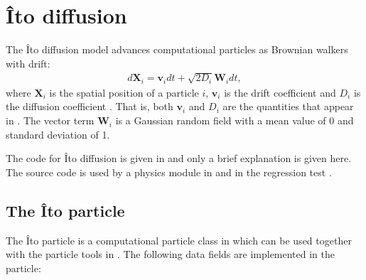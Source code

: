 \documentclass[letterpaper,10pt,english]{sphinxmanual}
\begin{document}
\section{Îto diffusion}
\label{\detokenize{Solvers/Ito:ito-diffusion}}\label{\detokenize{Solvers/Ito:chap-itodiffusion}}\label{\detokenize{Solvers/Ito::doc}}
\sphinxAtStartPar
The Îto diffusion model advances computational particles as Brownian walkers with drift:
\begin{equation*}
\begin{split}d\mathbf{X}_i = \mathbf{v}_idt + \sqrt{2D_i}\mathbf{W}_i dt,\end{split}
\end{equation*}
\sphinxAtStartPar
where \(\mathbf{X}_i\) is the spatial position of a particle \(i\), \(\mathbf{v}_i\) is the drift coefficient and \(D_i\) is the diffusion coefficient .
That is, both \(\mathbf{v}_i\) and \(D_i\) are the quantities that appear in {\hyperref[\detokenize{Solvers/CDR:chap-cdr}]{}}.
The vector term \(\mathbf{W}_i\) is a Gaussian random field with a mean value of 0 and standard deviation of 1.

\sphinxAtStartPar
The code for Îto diffusion is given in  and only a brief explanation is given here.
The source code is used by a physics module in  and in the regression test .


\subsection{The Îto particle}
\label{\detokenize{Solvers/Ito:the-ito-particle}}\label{\detokenize{Solvers/Ito:chap-ito-particle}}
\sphinxAtStartPar
The Îto particle is a computational particle class in  which can be used together with the particle tools in .
The following data fields are implemented in the particle:

\begin{sphinxVerbatim}[commandchars=\\\{\},formatcom=\scriptsize]
 
 
 
 
\end{sphinxVerbatim}
\end{document}

